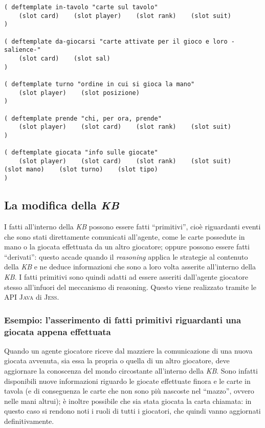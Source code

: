 \begin{lstlisting}[caption={Alcuni template di fatti la cui validità è limitata alla giocata corrente}, label=fattidiMano]
( deftemplate in-tavolo "carte sul tavolo"
    (slot card)    (slot player)    (slot rank)    (slot suit)
)

( deftemplate da-giocarsi "carte attivate per il gioco e loro -salience-"
    (slot card)    (slot sal)
)

( deftemplate turno "ordine in cui si gioca la mano"
    (slot player)    (slot posizione)
)

( deftemplate prende "chi, per ora, prende"
    (slot player)    (slot card)    (slot rank)    (slot suit)
)

( deftemplate giocata "info sulle giocate"
    (slot player)    (slot card)    (slot rank)    (slot suit)    (slot mano)    (slot turno)    (slot tipo)
)
\end{lstlisting}




\subsection{La modifica della \emph{KB}}

I fatti all'interno della \emph{KB} possono essere fatti ``primitivi'', cioè riguardanti eventi che sono stati direttamente comunicati all'agente, come le carte possedute in mano o la giocata effettuata da un altro giocatore; oppure possono essere fatti ``derivati'': questo accade quando il \emph{reasoning} applica le strategie al contenuto della \emph{KB} e ne deduce informazioni che sono a loro volta asserite all'interno della \emph{KB}.
I fatti primitivi sono quindi adatti ad essere asseriti dall'agente giocatore stesso all'infuori del meccanismo di reasoning.
Questo viene realizzato tramite le API \textsc{Java} di \textsc{Jess}.

\subsubsection*{Esempio: l'asserimento di fatti primitivi riguardanti una giocata appena effettuata}

Quando un agente giocatore riceve dal mazziere la comunicazione di una nuova giocata avvenuta, sia essa la propria o quella di un altro giocatore, deve aggiornare la conoscenza del mondo circostante all'interno della \emph{KB}.
Sono infatti disponibili nuove informazioni riguardo le giocate effettuate finora e le carte in tavola (e di conseguenza le carte che non sono più nascoste nel ``mazzo'', ovvero nelle mani altrui); è inoltre possibile che sia stata giocata la carta chiamata: in questo caso si rendono noti i ruoli di tutti i giocatori, che quindi vanno aggiornati definitivamente.



